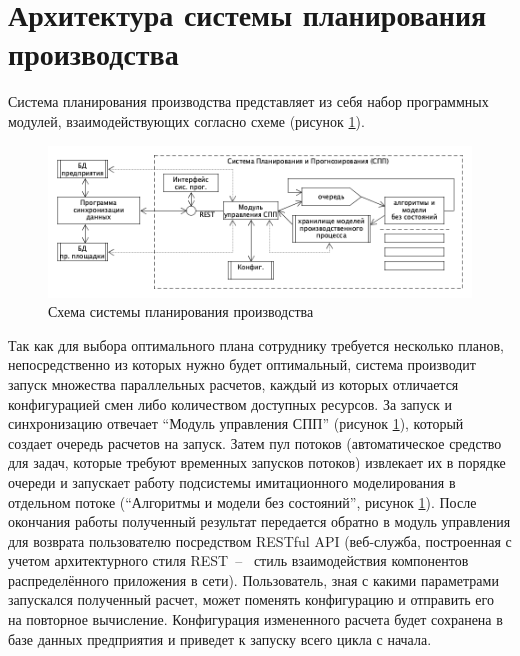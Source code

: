 \section{Архитектура системы планирования производства}
\indent Система планирования производства представляет из себя набор программных модулей, взаимодействующих согласно схеме (рисунок \ref{fig:archSPP}).

\begin{figure}[ht]
	\centering
	\includegraphics[width=\linewidth]{pics/archSPP.png}
	\caption{Схема системы планирования производства \cite{niorkpz}}
	\label{fig:archSPP}
\end{figure}

\indent Так как для выбора оптимального плана сотруднику требуется несколько планов, непосредственно из которых нужно будет оптимальный, система производит запуск множества параллельных расчетов, каждый из которых отличается конфигурацией смен либо количеством доступных ресурсов.
За запуск и синхронизацию отвечает ``Модуль управления СПП'' (рисунок \ref{fig:archSPP}), который создает очередь расчетов на запуск.
Затем пул потоков (автоматическое средство для задач, которые требуют временных запусков потоков) извлекает их в порядке очереди и запускает работу подсистемы имитационного моделирования в отдельном потоке (``Алгоритмы и модели без состояний'', рисунок \ref{fig:archSPP}).
После окончания работы полученный результат передается обратно в модуль управления для возврата пользователю посредством RESTful API (веб-служба, построенная с учетом архитектурного стиля REST~--~ стиль взаимодействия компонентов распределённого приложения в сети).
Пользователь, зная с какими параметрами запускался полученный расчет, может поменять конфигурацию и отправить его на повторное вычисление.
Конфигурация измененного расчета будет сохранена в базе данных предприятия и приведет к запуску всего цикла с начала.